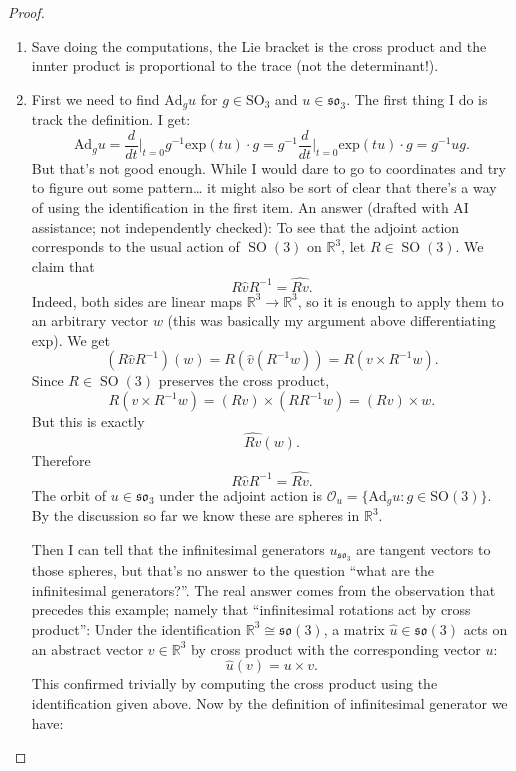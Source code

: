 \begin{proof}
\begin{enumerate}
\item Save doing the computations,
the Lie bracket is the cross product
and the innter product is proportional
to the trace (not the determinant!).

\item First we need to find
$\text{Ad}_gu$ for
$g \in \text{SO}_3$
and $u \in \mathfrak{so}_3$.
The first thing I do is track the definition.
I get:
$$
\text{Ad}_gu
=\frac{d}{dt}\Big|_{t=0}
g^{-1}\text{exp}(tu)\cdot g
=g^{-1}\frac{d}{dt}\Big|_{t=0}\text{exp}(tu)\cdot
g=g^{-1}ug.
$$
But that's not good enough.
While I would dare to go to coordinates
and try to figure out some pattern…
it might also be sort of clear
that there's a way of using the
identification in the first item.
An answer
(drafted with AI assistance; not independently checked):
To see that the adjoint action corresponds to
the usual action of $\operatorname{SO}(3)$ on
$\mathbb{R}^3$, let $R\in\operatorname{SO}(3)$.
We claim that
$$
R\hat vR^{-1}=\widehat{Rv}.
$$
Indeed, both sides are linear maps
$\mathbb{R}^3\to\mathbb{R}^3$, so it is
enough to apply them to an arbitrary vector
$w$ (this was basically my 
argument above differentiating exp). We get
$$
(R\hat vR^{-1})(w)
=
R(\hat v(R^{-1}w))
=
R(v\times R^{-1}w).
$$
Since $R\in\operatorname{SO}(3)$ preserves
the cross product,
$$
R(v\times R^{-1}w)
=
(Rv)\times(RR^{-1}w)
=
(Rv)\times w.
$$
But this is exactly
$$
\widehat{Rv}(w).
$$
Therefore
$$
R\hat vR^{-1}=\widehat{Rv}.
$$
The orbit of $u \in \mathfrak{so}_3$
under the adjoint action is 
$\mathcal{O}_u=\{\text{Ad}_gu:g \in
\text{SO}(3)\}$. By the discussion
so far we know these are spheres
in $\mathbb{R}^3$.

Then I can tell that the infinitesimal
generators $u_{\mathfrak{so}_3}$
are tangent vectors to those spheres,
but that's no answer to the question
``what are the infinitesimal generators?''.
The real answer comes from the observation
that precedes this example; namely 
that ``infinitesimal rotations
act by cross product'':
Under the identification
$\mathbb R^3\cong\mathfrak{so}(3)$,
a matrix $\hat u\in\mathfrak{so}(3)$ acts on
an abstract vector $v\in\mathbb R^3$ by
cross product with the corresponding vector
$u$:
$$
\hat u(v)=u\times v.
$$
This confirmed trivially by
computing the cross product using the
identification given above.
Now by the definition of infinitesimal
generator we have:

\end{enumerate}
\end{proof}

